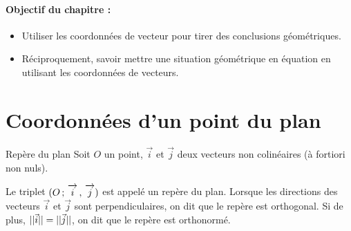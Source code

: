 \documentclass[10pt,a4paper,openany,twoside, prof]{book}
\begin{document}
\entetegal{}

\paragraph*{Objectif du chapitre :}
\vspace{-3mm}
\begin{itemize}
	\item Utiliser les coordonnées de vecteur pour tirer des conclusions géométriques.
	\item Réciproquement, savoir mettre une situation géométrique en équation en utilisant les coordonnées de vecteurs.
\end{itemize}
\vspace{-3mm}


\section{Coordonnées d'un point du plan}

\begin{defi}{Repère du plan}{}
	Soit $O$ un point, $\vec{i}$ et $\vec{j}$ deux vecteurs non colinéaires (à fortiori non nuls).

	Le triplet $(O\,;\,\overrightarrow{\,\mathstrut i\,}\,,\,\overrightarrow{\,\mathstrut j\,})$ est appelé un repère du plan. Lorsque les directions des vecteurs $\vec{i}$ et $\vec{j}$ sont perpendiculaires, on dit que le repère est orthogonal. Si de plus, $||\vec{i}||=||\vec{j}||$, on dit que le repère est orthonormé.

	\begin{minipage}{.5\linewidth}
	\end{minipage}
	\begin{minipage}{.5\linewidth}
	\end{minipage}

\end{defi}
\end{document}
